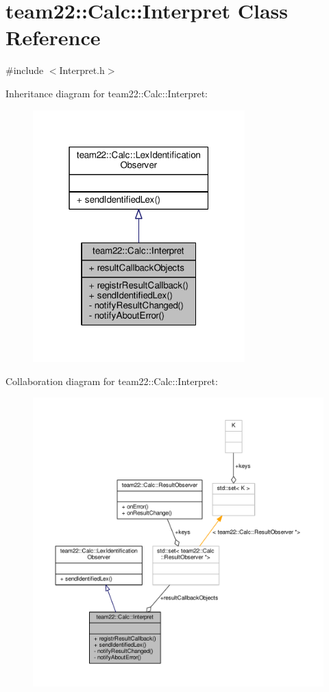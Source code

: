 \hypertarget{classteam22_1_1_calc_1_1_interpret}{}\section{team22\+:\+:Calc\+:\+:Interpret Class Reference}
\label{classteam22_1_1_calc_1_1_interpret}


{\ttfamily \#include $<$Interpret.\+h$>$}



Inheritance diagram for team22\+:\+:Calc\+:\+:Interpret\+:
\nopagebreak
\begin{figure}[H]
\begin{center}
\leavevmode
\includegraphics[width=232pt]{classteam22_1_1_calc_1_1_interpret__inherit__graph}
\end{center}
\end{figure}


Collaboration diagram for team22\+:\+:Calc\+:\+:Interpret\+:
\nopagebreak
\begin{figure}[H]
\begin{center}
\leavevmode
\includegraphics[width=350pt]{classteam22_1_1_calc_1_1_interpret__coll__graph}
\end{center}
\end{figure}
